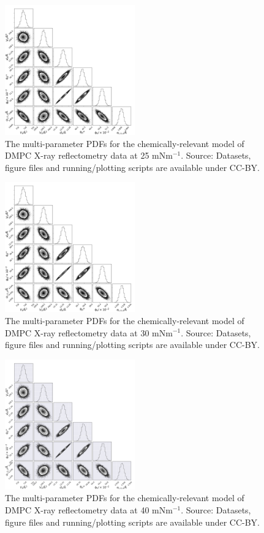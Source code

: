 \documentclass[11pt,a4paper]{article}
\begin{document}
\begin{figure}[h]
	\centering
	\includegraphics[width=0.50\textwidth]{figures/dmpc3_all_corner}
	\caption{The multi-parameter PDFs for the chemically-relevant model of DMPC X-ray reflectometry data at 25 mNm$^{-1}$. Source: Datasets, figure files and running/plotting scripts are available under CC-BY.\cite{mccluskey_2018}}
	\label{fig:dmpc3}
\end{figure}
\begin{figure}[h]
	\centering
	\includegraphics[width=0.50\textwidth]{figures/dmpc4_all_corner}
	\caption{The multi-parameter PDFs for the chemically-relevant model of DMPC X-ray reflectometry data at 30 mNm$^{-1}$. Source: Datasets, figure files and running/plotting scripts are available under CC-BY.\cite{mccluskey_2018}}
	\label{fig:dmpc4}
\end{figure}
\begin{figure}
	\centering
	\includegraphics[width=0.50\textwidth]{figures/dmpc5_all_corner}
	\caption{The multi-parameter PDFs for the chemically-relevant model of DMPC X-ray reflectometry data at 40 mNm$^{-1}$. Source: Datasets, figure files and running/plotting scripts are available under CC-BY.\cite{mccluskey_2018}}
	\label{fig:dmpc5}
\end{figure}
\end{document}
